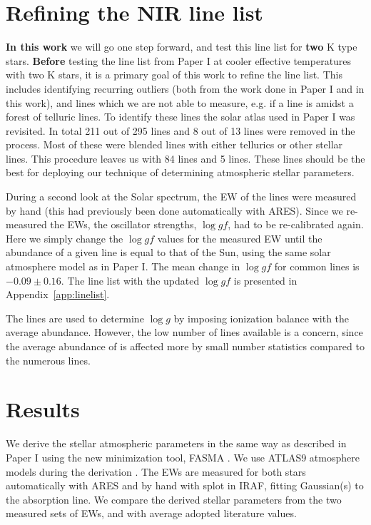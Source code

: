 \documentclass{aa}
\begin{document}
\section{Refining the NIR line list}
\label{sec:refining_the_line_list}

{\bf In this work} we will go one step forward, and test this line list for {\bf
two} K type stars. {\bf Before} testing the line list from Paper I at cooler
effective temperatures with two K stars, it is a primary goal of this work to
refine the line list. This includes identifying recurring outliers (both from
the work done in Paper I and in this work), and lines which we are not able to
measure, e.g. if a line is amidst a forest of telluric lines. To identify these
lines the solar atlas used in Paper I was revisited. In total 211 out of 295
 lines and 8 out of 13  lines were removed in the
process. Most of these were blended lines with either tellurics or other stellar
lines. This procedure leaves us with 84  lines and 5 
lines. These lines should be the best for deploying our technique of determining
atmospheric stellar parameters.

During a second look at the Solar spectrum, the EW of the lines were measured by
hand (this had previously been done automatically with ARES). Since we
re-measured the EWs, the oscillator strengths, $\log \mathit{gf}$, had to be
re-calibrated again. Here we simply change the $\log \mathit{gf}$ values for the
measured EW until the abundance of a given line is equal to that of the Sun,
using the same solar atmosphere model as in Paper I. The mean change in $\log
\mathit{gf}$ for common lines is $-0.09 \pm 0.16$. The line list with the
updated $\log \mathit{gf}$ is presented in Appendix~\ref{app:linelist}.

The  lines are used to determine $\log g$ by imposing ionization
balance with the average  abundance. However, the low number of
 lines available is a concern, since the average abundance of
 is affected more by small number statistics compared to the
numerous  lines.



\section{Results}
\label{sec:results}

We derive the stellar atmospheric parameters in the same way as described in
Paper I using the new minimization tool, FASMA \citep{Andreasen2017a}. We use
ATLAS9 atmosphere models during the derivation \citep{Kurucz1993}. The EWs are
measured for both stars automatically with ARES \citep{Sousa2015a} and by hand
with splot in IRAF, fitting Gaussian(s) to the absorption line. We compare the
derived stellar parameters from the two measured sets of EWs, and with average
adopted literature values.
\end{document}
